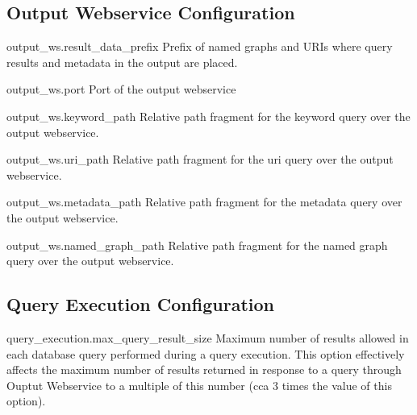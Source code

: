 \subsection*{Output Webservice Configuration}
\begin{configlist}
	\item[output\_ws.result\_data\_prefix]
		Prefix of named graphs and URIs where query results and metadata in the output are placed.
	\item[output\_ws.port]
		Port of the output webservice
	\item[output\_ws.keyword\_path]
		Relative path fragment for the keyword query over the output webservice.
	\item[output\_ws.uri\_path]
		Relative path fragment for the uri query over the output webservice.
	\item[output\_ws.metadata\_path]
		Relative path fragment for the metadata query over the output webservice.
	\item[output\_ws.named\_graph\_path]
		Relative path fragment for the named graph query over the output webservice.
\end{configlist}

\subsection*{Query Execution Configuration}	
\begin{configlist}
	\item[query\_execution.max\_query\_result\_size]
		Maximum number of results allowed in each database query performed during a query execution. This option effectively affects the maximum number of results returned in response to a query through Ouptut Webservice to a multiple of this number (cca 3 times the value of this option).
\end{configlist}

